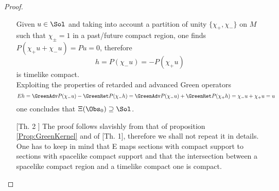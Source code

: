 \documentclass[Main]{subfiles}
\begin{document}
\begin{proof}
\begin{itemize}
						Given $u \in \Sol$ and taking into account a partition of unity $\{\chi_+, \chi_-\}$ on $M$ such that $\chi_\pm = 1$ in a past/future compact region, one finds $P ( \chi_+ u +  \chi_- u ) = P u=0$, therefore
						\begin{displaymath}
							h = P(\chi_-u) = - P(\chi_+ u)
						\end{displaymath}
						is timelike compact.\\
						Exploiting the properties of retarded and advanced Green operators
						\begin{displaymath}
							E h = \GreenAdv P (\chi_- u ) - \GreenRet P (\chi_- h ) =
							\GreenAdv P (\chi_- u ) + \GreenRet P (\chi_+ h ) = \chi_-u + \chi_+ u = u
						\end{displaymath}
						one concludes that $\Xi ( \Obs_0) \supseteq \Sol$.

			\item[	[Th. 2]]
						The proof follows slavishly from that of proposition \ref{Prop:GreenKernel} and of [Th. 1], therefore we shall not repeat it in details.
						One has %
						to keep in mind that E maps sections with compact support to sections with spacelike compact support and that the intersection between a spacelike compact region and a timelike compact one is compact.
		\end{itemize}
	\end{proof}
\fi
\end{document}

